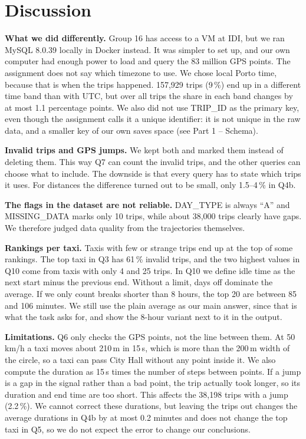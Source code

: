 \documentclass[12pt,a4paper]{article}
\begin{document}
\section*{Discussion}

\textbf{What we did differently.} Group 16 has access to a VM at IDI, but we
ran MySQL 8.0.39 locally in Docker instead. It was simpler to set up, and
our own computer had enough power to load and query the 83 million GPS
points.
The assignment does not say which timezone to use. We chose local Porto
time, because that is when the trips happened. 157,929 trips (9\,\%) end up
in a different time band than with UTC, but over all trips the share in
each band changes by at most 1.1 percentage points.
We also did not use TRIP\_ID as the primary key, even though the assignment
calls it a unique identifier: it is not unique in the raw data, and a
smaller key of our own saves space (see Part 1 -- Schema).

\textbf{Invalid trips and GPS jumps.} We kept both and marked them instead
of deleting them. This way Q7 can count the invalid trips, and the other
queries can choose what to include. The downside is that every query has to
state which trips it uses. For distances the difference turned out to be
small, only 1.5--4\,\% in Q4b.

\textbf{The flags in the dataset are not reliable.} DAY\_TYPE is always ``A''
and MISSING\_DATA marks only 10 trips, while about 38,000 trips clearly have
gaps. We therefore judged data quality from the trajectories themselves.

\textbf{Rankings per taxi.} Taxis with few or strange trips end up at the top
of some rankings. The top taxi in Q3 has 61\,\% invalid trips, and the two
highest values in Q10 come from taxis with only 4 and 25 trips. In Q10 we
define idle time as the next start minus the previous end. Without a limit,
days off dominate the average. If we only count breaks shorter than 8 hours,
the top 20 are between 85 and 106 minutes. We still use the plain average
as our main answer, since that is what the task asks for, and show the
8-hour variant next to it in the output.

\textbf{Limitations.} Q6 only checks the GPS points, not the line between
them. At 50\,km/h a taxi moves about 210\,m in 15\,s, which is more than the
200\,m width of the circle, so a taxi can pass City Hall without any point
inside it. We also compute the duration as 15\,s times the number of steps
between points. If a jump is a gap in the signal rather than a bad point,
the trip actually took longer, so its duration and end time are too short.
This affects the 38,198 trips with a jump (2.2\,\%). We cannot correct these
durations, but leaving the trips out changes the average durations in Q4b
by at most 0.2 minutes and does not change the top taxi in Q5, so we do not
expect the error to change our conclusions.
\end{document}
